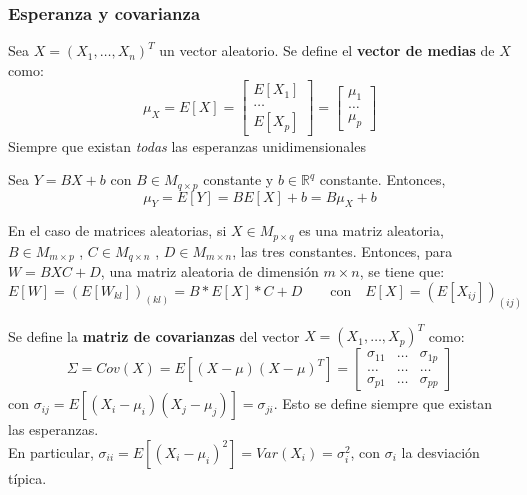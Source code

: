 \subsubsection{Esperanza y covarianza}
\begin{ndef}
  Sea $X=(X_1,\dots,X_n)^T$ un vector aleatorio. Se define el \textbf{vector de medias} de $X$ como:
  \[
  \mu_X = E[X] = \begin{bmatrix}  E[X_1] \\ \dots \\ E[X_p] \end{bmatrix} = \begin{bmatrix} \mu_1 \\ \dots \\ \mu_p \end{bmatrix}
  \]
  Siempre que existan \emph{todas} las esperanzas unidimensionales
  \end{ndef}

\begin{nprop}
  Sea $Y = BX + b$ con $B \in M_{q\times p}$ constante y $b \in \mathbb R^q$ constante. Entonces,
  \[
\mu_Y = E[Y] = BE[X] + b = B\mu_X + b
\]
\end{nprop}

En el caso de matrices aleatorias, si $X\in M_{p\times q}$ es una matriz aleatoria, $B\in M_{m\times p}$ , $C \in M_{q\times n}$ , $D \in M_{m \times n}$, las tres constantes. Entonces, para $W = BXC + D$, una matriz aleatoria de dimensión $m\times n$, se tiene que:
\[
E[W] = (E[W_{kl}])_{(kl)} = B * E[X] * C + D \quad \quad \text{con} \quad E[X] = (E[X_{ij}])_{(ij)}
\]

\begin{ndef}
  Se define la \textbf{matriz de covarianzas} del vector $X = (X_1,\dots,X_p)^T$ como:
  \[
\Sigma = Cov(X) = E[(X-\mu)(X-\mu)^T] = \begin{bmatrix} \sigma_{11} & \dots & \sigma_{1p} \\ \dots& \dots & \dots \\ \sigma_{p1} &  \dots & \sigma_{pp}\end{bmatrix}
\]
con $\sigma_{ij} = E[(X_i - \mu_i)(X_j - \mu_j)] = \sigma_{ji}$. Esto se define siempre que existan las esperanzas.\\
En particular, $\sigma_{ii}=E[(X_i - \mu_i)^2] = Var(X_i) = \sigma_i^2$, con $\sigma_i$ la desviación típica.
\end{ndef}

